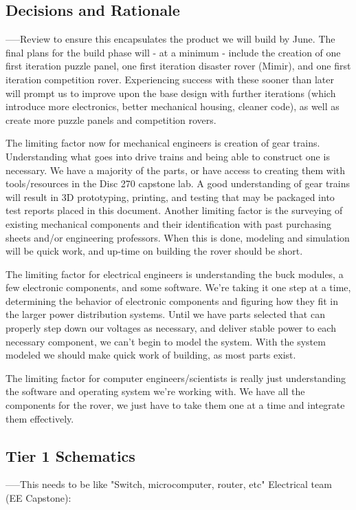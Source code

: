 \documentclass[a4paper, 10pt]{article}
\begin{document}
	\subsection{Decisions and Rationale}
	-----Review to ensure this encapsulates the product we will build by June.
	The final plans for the build phase will - at a minimum - include the creation of one first iteration puzzle panel, one first iteration disaster rover (Mimir), and one first iteration competition rover. Experiencing success with these sooner than later will prompt us to improve upon the base design with further iterations (which introduce more electronics, better mechanical housing, cleaner code), as well as create more puzzle panels and competition rovers.
	
	The limiting factor now for mechanical engineers is creation of gear trains. Understanding what goes into drive trains and being able to construct one is necessary. We have a majority of the parts, or have access to creating them with tools/resources in the Disc 270 capstone lab. A good understanding of gear trains will result in 3D prototyping, printing, and testing that may be packaged into test reports placed in this document. Another limiting factor is the surveying of existing mechanical components and their identification with past purchasing sheets and/or engineering professors. When this is done, modeling and simulation will be quick work, and up-time on building the rover should be short.

	The limiting factor for electrical engineers is understanding the buck modules, a few electronic components, and some software. We're taking it one step at a time, determining the behavior of electronic components and figuring how they fit in the larger power distribution systems. Until we have parts selected that can properly step down our voltages as necessary, and deliver stable power to each necessary component, we can't begin to model the system. With the system modeled we should make quick work of building, as most parts exist.

	The limiting factor for computer engineers/scientists is really just understanding the software and operating system we're working with. We have all the components for the rover, we just have to take them one at a time and integrate them effectively.

	\subsection{Tier 1 Schematics}
	-----This needs to be like "Switch, microcomputer, router, etc"
	Electrical team (EE Capstone):
	
\end{document}
